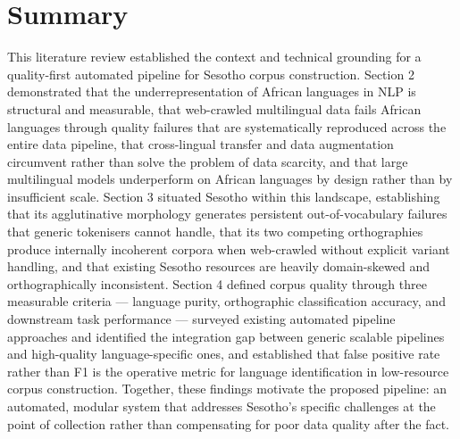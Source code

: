 \documentclass[11pt,a4paper]{article}
\begin{document}
\section{Summary}
This literature review established the context and technical grounding for a quality-first automated pipeline for Sesotho corpus construction. Section 2 demonstrated that the underrepresentation of African languages in NLP is structural and measurable, that web-crawled multilingual data fails African languages through quality failures that are systematically reproduced across the entire data pipeline, that cross-lingual transfer and data augmentation circumvent rather than solve the problem of data scarcity, and that large multilingual models underperform on African languages by design rather than by insufficient scale. Section 3 situated Sesotho within this landscape, establishing that its agglutinative morphology generates persistent out-of-vocabulary failures that generic tokenisers cannot handle, that its two competing orthographies produce internally incoherent corpora when web-crawled without explicit variant handling, and that existing Sesotho resources are heavily domain-skewed and orthographically inconsistent. Section 4 defined corpus quality through three measurable criteria — language purity, orthographic classification accuracy, and downstream task performance — surveyed existing automated pipeline approaches and identified the integration gap between generic scalable pipelines and high-quality language-specific ones, and established that false positive rate rather than F1 is the operative metric for language identification in low-resource corpus construction. Together, these findings motivate the proposed pipeline: an automated, modular system that addresses Sesotho's specific challenges at the point of collection rather than compensating for poor data quality after the fact.


\clearpage
  
\end{document}
